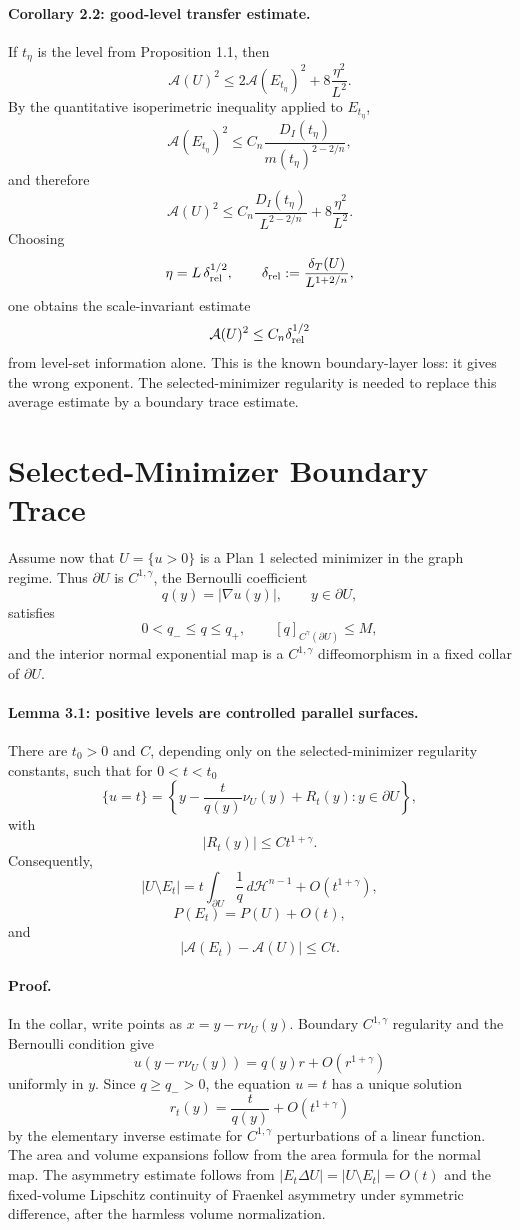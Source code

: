 \documentclass[11pt]{article}
\begin{document}
\paragraph{Corollary 2.2: good-level transfer estimate.}
If \(t_\eta\) is the level from Proposition 1.1, then
\[
\mathcal A(U)^2
\le
2\mathcal A(E_{t_\eta})^2
+8\frac{\eta^2}{L^2}.
\]
By the quantitative isoperimetric inequality applied to \(E_{t_\eta}\),
\[
\mathcal A(E_{t_\eta})^2
\le
C_n\frac{D_I(t_\eta)}{m(t_\eta)^{2-2/n}},
\]
and therefore
\[
\mathcal A(U)^2
\le
C_n\frac{D_I(t_\eta)}{L^{2-2/n}}
+8\frac{\eta^2}{L^2}.
\]
Choosing
\[
\eta=L\,\delta_{\rm rel}^{1/2},
\qquad
\delta_{\rm rel}:=\frac{\delta_T(U)}{L^{1+2/n}},
\]
one obtains the scale-invariant estimate
\[
\mathcal A(U)^2
\le
C_n\delta_{\rm rel}^{1/2}
\]
from level-set information alone. This is the known boundary-layer loss: it
gives the wrong exponent. The selected-minimizer regularity is needed to
replace this average estimate by a boundary trace estimate.

\section{Selected-Minimizer Boundary Trace}

Assume now that \(U=\{u>0\}\) is a Plan 1 selected minimizer in the graph
regime. Thus \(\partial U\) is \(C^{1,\gamma}\), the Bernoulli coefficient
\[
q(y)=|\nabla u(y)|,\qquad y\in\partial U,
\]
satisfies
\[
0<q_-\le q\le q_+,\qquad [q]_{C^\gamma(\partial U)}\le M,
\]
and the interior normal exponential map is a \(C^{1,\gamma}\) diffeomorphism in
a fixed collar of \(\partial U\).

\paragraph{Lemma 3.1: positive levels are controlled parallel surfaces.}
There are \(t_0>0\) and \(C\), depending only on the selected-minimizer
regularity constants, such that for \(0<t<t_0\)
\[
\{u=t\}
=
\left\{
y-\frac{t}{q(y)}\nu_U(y)+R_t(y):
y\in\partial U
\right\},
\]
with
\[
|R_t(y)|\le C t^{1+\gamma}.
\]
Consequently,
\[
|U\setminus E_t|
=
t\int_{\partial U}\frac1q\,d\mathcal H^{n-1}
+O(t^{1+\gamma}),
\]
\[
P(E_t)=P(U)+O(t),
\]
and
\[
\bigl|\mathcal A(E_t)-\mathcal A(U)\bigr|\le C t.
\]

\paragraph{Proof.}
In the collar, write points as \(x=y-r\nu_U(y)\). Boundary \(C^{1,\gamma}\)
regularity and the Bernoulli condition give
\[
u(y-r\nu_U(y))=q(y)r+O(r^{1+\gamma})
\]
uniformly in \(y\). Since \(q\ge q_->0\), the equation \(u=t\) has a unique
solution
\[
r_t(y)=\frac{t}{q(y)}+O(t^{1+\gamma})
\]
by the elementary inverse estimate for \(C^{1,\gamma}\) perturbations of a
linear function. The area and volume expansions follow from the area formula
for the normal map. The asymmetry estimate follows from
\(|E_t\Delta U|=|U\setminus E_t|=O(t)\) and the fixed-volume Lipschitz
continuity of Fraenkel asymmetry under symmetric difference, after the harmless
volume normalization.
\end{document}
